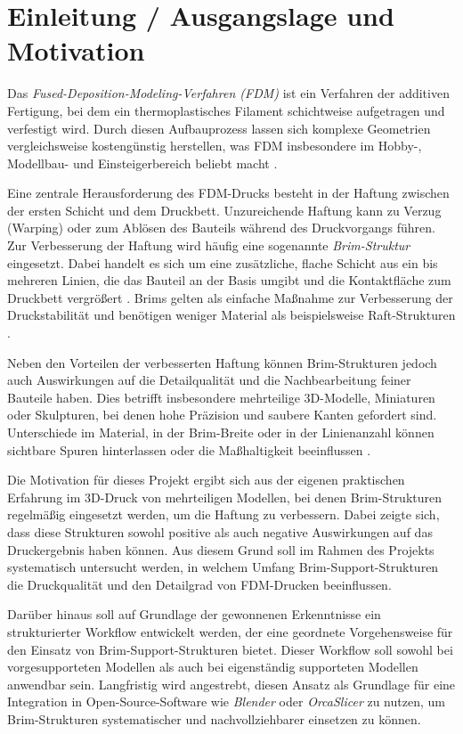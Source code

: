 \chapter{Einleitung / Ausgangslage und Motivation}
\label{cha:Einleitung / Ausgangslage und Motivation}

Das \textit{Fused-Deposition-Modeling-Verfahren (FDM)} ist ein Verfahren der additiven Fertigung, bei dem ein thermoplastisches Filament schichtweise aufgetragen und verfestigt wird. Durch diesen Aufbauprozess lassen sich komplexe Geometrien vergleichsweise kostengünstig herstellen, was FDM insbesondere im Hobby-, Modellbau- und Einsteigerbereich beliebt macht \cite{Kristiawan2021, FDMReview2021}.  

Eine zentrale Herausforderung des FDM-Drucks besteht in der Haftung zwischen der ersten Schicht und dem Druckbett. Unzureichende Haftung kann zu Verzug (Warping) oder zum Ablösen des Bauteils während des Druckvorgangs führen. Zur Verbesserung der Haftung wird häufig eine sogenannte \textit{Brim-Struktur} eingesetzt. Dabei handelt es sich um eine zusätzliche, flache Schicht aus ein bis mehreren Linien, die das Bauteil an der Basis umgibt und die Kontaktfläche zum Druckbett vergrößert \cite{Facfox2023}. Brims gelten als einfache Maßnahme zur Verbesserung der Druckstabilität und benötigen weniger Material als beispielsweise Raft-Strukturen \cite{JLC3DP2023}.  

Neben den Vorteilen der verbesserten Haftung können Brim-Strukturen jedoch auch Auswirkungen auf die Detailqualität und die Nachbearbeitung feiner Bauteile haben. Dies betrifft insbesondere mehrteilige 3D-Modelle, Miniaturen oder Skulpturen, bei denen hohe Präzision und saubere Kanten gefordert sind. Unterschiede im Material, in der Brim-Breite oder in der Linienanzahl können sichtbare Spuren hinterlassen oder die Maßhaltigkeit beeinflussen \cite{FFFPolymerReview}.  

Die Motivation für dieses Projekt ergibt sich aus der eigenen praktischen Erfahrung im 3D-Druck von mehrteiligen Modellen, bei denen Brim-Strukturen regelmäßig eingesetzt werden, um die Haftung zu verbessern. Dabei zeigte sich, dass diese Strukturen sowohl positive als auch negative Auswirkungen auf das Druckergebnis haben können. Aus diesem Grund soll im Rahmen des Projekts systematisch untersucht werden, in welchem Umfang Brim-Support-Strukturen die Druckqualität und den Detailgrad von FDM-Drucken beeinflussen.  

Darüber hinaus soll auf Grundlage der gewonnenen Erkenntnisse ein strukturierter Workflow entwickelt werden, der eine geordnete Vorgehensweise für den Einsatz von Brim-Support-Strukturen bietet. Dieser Workflow soll sowohl bei vorgesupporteten Modellen als auch bei eigenständig supporteten Modellen anwendbar sein. Langfristig wird angestrebt, diesen Ansatz als Grundlage für eine Integration in Open-Source-Software wie \textit{Blender} oder \textit{OrcaSlicer} zu nutzen, um Brim-Strukturen systematischer und nachvollziehbarer einsetzen zu können.